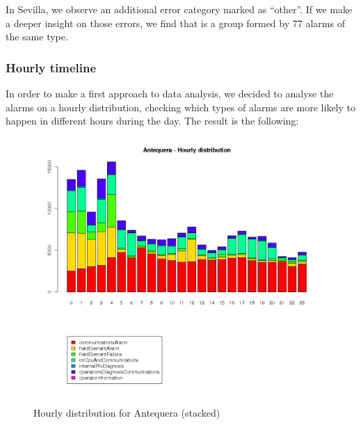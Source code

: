 \documentclass[a4paper,12pt]{article}
\begin{document}
In Sevilla, we observe an additional error category marked as ``other''. If we make a deeper insight on those errors, we find that is a group formed by 77 alarms of the same type.

\subsubsection{Hourly timeline}

In order to make a first approach to data analysis, we decided to analyse the alarms on a hourly distribution, checking which types of alarms are more likely to happen in different hours during the day. The result is the following:

\clearpage

\begin{figure}[h!]
 \centering
 \includegraphics[height=0.4\textheight]{./img/antequera_timeline.png}
 \caption{Hourly distribution for Antequera (stacked)}
\end{figure}
\end{document}
